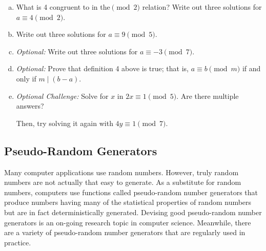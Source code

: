\documentclass[12pt,letterpaper]{article}
\begin{document}
	\begin{enumerate}[a.]
	    \item What is 4 congruent to in the$\pmod 2$ relation? Write out three solutions for $a \equiv 4 \pmod 2$.
	    \begin{mdframed} \vspace{1cm} \end{mdframed}
	    
	    \item 
	    Write out three solutions for $a \equiv 9 \pmod 5$.
	    \begin{mdframed} \vspace{1cm} \end{mdframed}
	    
	    \item \textit{Optional:} Write out three solutions for $a \equiv -3 \pmod 7$.
	    \begin{mdframed} \vspace{1cm} \end{mdframed}
	    
	    \item \textit{Optional:} Prove that definition 4 above is true; that is, $a \equiv b \pmod m$ if and only if $m \mid (b-a)$.
	    
	    \begin{mdframed} \vspace{3cm} \end{mdframed}
        
        \item \textit{Optional Challenge:} Solve for $x$ in $2x \equiv 1 \pmod 5$. Are there multiple answers?
        
        Then, try solving it again with $4y \equiv 1 \pmod 7$.
        
        \begin{mdframed} \vspace{2cm} \end{mdframed}
    \end{enumerate}

\newpage
\subsection*{Pseudo-Random Generators}
Many computer applications use random numbers. However, truly random numbers are not actually that easy to generate. As a substitute for random numbers, computers use functions called pseudo-random number generators that produce numbers having many of the statistical properties of random numbers but are in fact deterministically generated. Devising good pseudo-random number generators is an on-going research topic in computer science. Meanwhile, there are a variety of pseudo-random number generators that are regularly used in practice.
\end{document}
